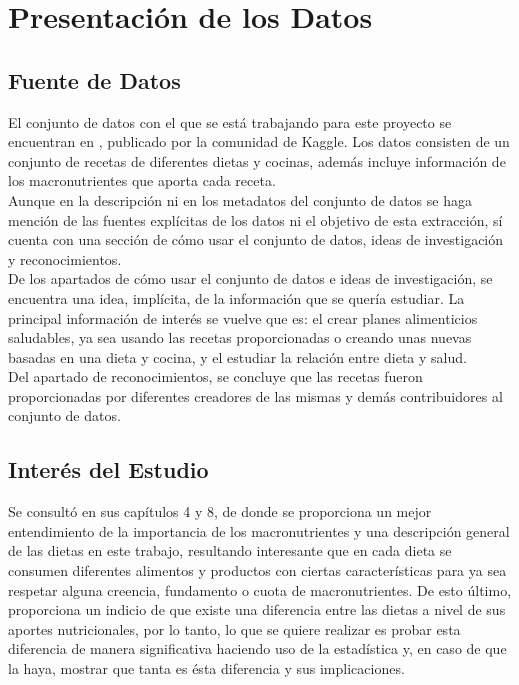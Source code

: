 \documentclass[12pt,a4paper]{article}
\begin{document}
    \section{Presentación de los Datos}
    {
        \subsection{Fuente de Datos}
        {
            El conjunto de datos con el que se está trabajando para este proyecto 
            se encuentran en \cite{dataset_macronutrients}, publicado por la comunidad 
            de Kaggle. Los datos consisten de un conjunto de recetas de diferentes 
            dietas y cocinas, además incluye información de los macronutrientes que 
            aporta cada receta.\\
            
            \cite{dataset_macronutrients} Aunque en la descripción ni en los metadatos del conjunto de datos se 
            haga mención de las fuentes explícitas de los datos ni el objetivo de 
            esta extracción, sí cuenta con una sección de cómo usar el conjunto de 
            datos, ideas de investigación y reconocimientos.\\
            
            De los apartados de cómo usar el conjunto de datos e ideas de investigación, 
            se encuentra una idea, implícita, de la información que se quería estudiar. 
            La principal información de interés se vuelve que es: el crear planes 
            alimenticios saludables, ya sea usando las recetas proporcionadas o creando 
            unas nuevas basadas en una dieta y cocina, y el estudiar la relación entre 
            dieta y salud.\\
            
            Del apartado de reconocimientos, se concluye que las recetas fueron 
            proporcionadas por diferentes creadores de las mismas y demás contribuidores 
            al conjunto de datos. 
        }

        \subsection{Interés del Estudio}
        {
            Se consultó \cite{marvastipopular} en sus 
            capítulos 4 y 8, de donde se proporciona un mejor entendimiento de la 
            importancia de los macronutrientes y una descripción general de las 
            dietas en este trabajo, resultando interesante que en cada dieta se 
            consumen diferentes alimentos y productos con ciertas características 
            para ya sea respetar alguna creencia, fundamento o cuota de macronutrientes. 
            De esto último, proporciona un indicio de que existe una diferencia entre 
            las dietas a nivel de sus aportes nutricionales, por lo tanto, lo que se 
            quiere realizar es probar esta diferencia de manera significativa haciendo 
            uso de la estadística y, en caso de que la haya, mostrar que tanta es ésta 
            diferencia y sus implicaciones.
        }

}
\end{document}
